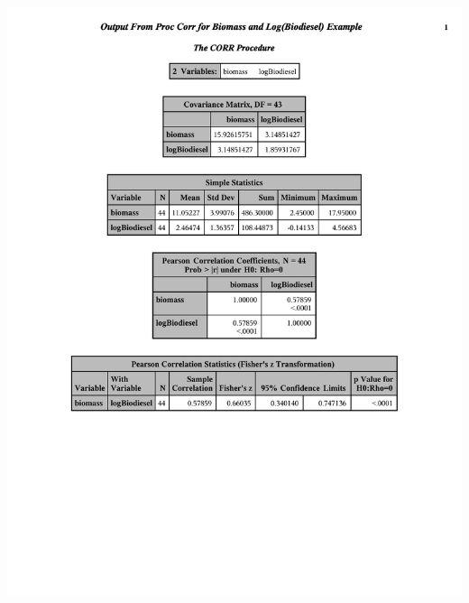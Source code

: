 \begin{center}
\includegraphics[scale=0.75,trim = 0mm 80mm 0mm 10mm]{corrbiodiesel.pdf}\label{corrbio}
\end{center}


